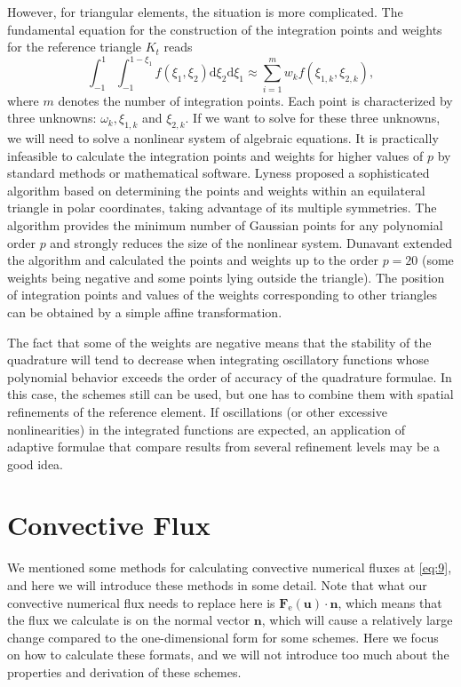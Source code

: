 \documentclass{develop-note}
\begin{document}
However, for triangular elements, the situation is more complicated. The fundamental equation for the construction of the integration points and weights for the reference triangle $K_{t}$ reads
\begin{equation}
  \int_{-1}^{1}\int_{-1}^{1-\xi_{1}}f(\xi_{1},\xi_{2})\mathrm{d}\xi_{2}\mathrm{d}\xi_{1}\approx\sum_{i=1}^{m}w_{k}f(\xi_{1,k},\xi_{2,k}),
\end{equation}
where $m$ denotes the number of integration points. Each point is characterized by three unknowns: $\omega_{k},\xi_{1,k}$ and $\xi_{2,k}$. If we want to solve for these three unknowns, we will need to solve a nonlinear system of algebraic equations. It is practically infeasible to calculate the integration points and weights for higher values of $p$ by standard methods or mathematical software. Lyness\cite{lynessModerateDegreeSymmetric1975} proposed a sophisticated algorithm based on determining the points and weights within an equilateral triangle in polar coordinates, taking advantage of its multiple symmetries. The algorithm provides the minimum number of Gaussian points for any polynomial order $p$ and strongly reduces the size of the nonlinear system. Dunavant\cite{dunavantHighDegreeEfficient1985} extended the algorithm and calculated the points and weights up to the order $p=20$ (some weights being negative and some points lying outside the triangle). The position of integration points and values of the weights corresponding to other triangles can be obtained by a simple affine transformation.

The fact that some of the weights are negative means that the stability of the quadrature will tend to decrease when integrating oscillatory functions whose polynomial behavior exceeds the order of accuracy of the quadrature formulae. In this case, the schemes still can be used, but one has to combine them with spatial refinements of the reference element. If oscillations (or other excessive nonlinearities) in the integrated functions are expected, an application of adaptive formulae that compare results from several refinement levels may be a good idea.

\section{Convective Flux}

We mentioned some methods for calculating convective numerical fluxes at \autoref{eq:9}, and here we will introduce these methods in some detail. Note that what our convective numerical flux needs to replace here is $\mathbf{F}_{\mathrm{e}}(\mathbf{u})\cdot\mathbf{n}$, which means that the flux we calculate is on the normal vector $\mathbf{n}$, which will cause a relatively large change compared to the one-dimensional form for some schemes. Here we focus on how to calculate these formats, and we will not introduce too much about the properties and derivation of these schemes.
\end{document}

